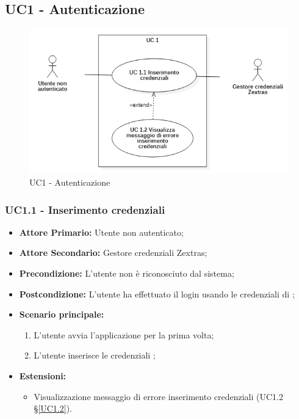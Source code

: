\subsection{UC1 - Autenticazione}
\begin{figure}[H]
    \centering
    \includegraphics[scale = 0.7]{components/img/UC1.png}
    \caption{UC1 - Autenticazione}
\end{figure}
\subsubsection{UC1.1 - Inserimento credenziali}
\begin{itemize}
\item \textbf{Attore Primario:} Utente non autenticato;
\item \textbf{Attore Secondario:} Gestore credenziali Zextras;
\item \textbf{Precondizione:} L'utente non è riconosciuto dal sistema;
\item \textbf{Postcondizione:} L'utente ha effettuato il login usando le credenziali di ;
\item \textbf{Scenario principale:}
    \begin{enumerate}
    \item L'utente avvia l'applicazione per la prima volta;
    \item L'utente inserisce le credenziali ;
    \end{enumerate}
\item \textbf{Estensioni:}
\begin{itemize}
\item Visualizzazione messaggio di errore inserimento credenziali (UC1.2 \S{}\ref{UC1.2}).
\end{itemize}
\end{itemize}

